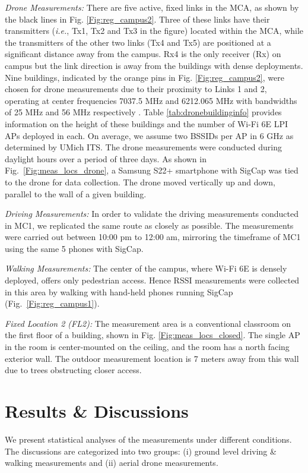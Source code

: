 \documentclass[sigconf,10pt]{acmart}
\begin{document}
\textit{Drone Measurements:} There are five active, fixed links in the MCA, as shown by the black lines in Fig. \ref{Fig:reg_campus2}. Three of these links have their transmitters (\textit{i.e.}, Tx1, Tx2 and Tx3 in the figure) located within the MCA, while the transmitters of the other two links (Tx4 and Tx5) are positioned at a significant distance away from the campus. Rx4 is the only receiver (Rx) on campus but the link direction is away from the buildings with dense deployments. Nine buildings, indicated by the orange pins in Fig. \ref{Fig:reg_campus2}, were chosen for drone measurements due to their proximity to Links 1 and 2, operating at center frequencies 7037.5 MHz and 6212.065 MHz with bandwidths of 25 MHz and 56 MHz respectively \cite{link1,link2}.
Table \ref{tab:dronebuildinginfo} provides information on the height of these buildings and the number of Wi-Fi 6E LPI APs deployed in each. On average, we assume two BSSIDs per AP in 6 GHz as determined by UMich ITS. \color{black} The drone measurements were conducted during daylight hours over a period of three days. As shown in Fig.~\ref{Fig:meas_locs_drone}, a Samsung S22+ smartphone with SigCap was tied to the drone for data collection. The drone moved vertically up and down, parallel to the wall of a given building. 

\textit{Driving Measurements:} In order to validate the driving measurements conducted in MC1, we replicated the same route as closely as possible. The measurements were carried out between 10:00 pm to 12:00 am, mirroring the timeframe of MC1 using the same 5 phones with SigCap.

\textit{Walking Measurements:}
The center of the campus, where Wi-Fi 6E is densely deployed, offers only pedestrian access. Hence RSSI measurements were collected in this area by walking with hand-held phones running SigCap (Fig.~\ref{Fig:reg_campus1}). 

\textit{Fixed Location 2 (FL2):} 
The measurement area is a conventional classroom on the first floor of a building, shown in Fig. \ref{Fig:meas_locs_closed}. The single AP in the room is center-mounted on the ceiling, and the room has a north facing exterior wall. The outdoor measurement location is 7 meters away from this wall due to trees obstructing closer access.

\section{Results \& Discussions}
We present statistical analyses of the measurements under different conditions. The discussions are categorized into two groups: (i) ground level driving \& walking measurements and (ii) aerial drone measurements. 
\end{document}
